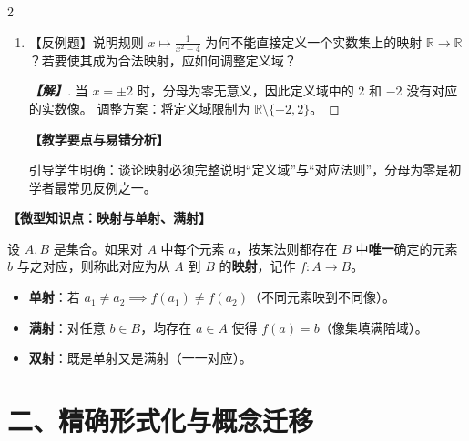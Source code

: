 \documentclass[12pt]{ctexart}
\newenvironment{solution}[1][解]{%
    \par\begingroup\color{blue!85!black}%
    \begin{proof}[\indent\bfseries\color{blue!85!black}【#1】]%
  }{%
    \end{proof}\endgroup\par
  }
\newenvironment{teacherNote}[1][教学要点与易错分析]{%
    \par\vspace{0.6ex}%
    \begingroup\color{teal!80!black}\small
    \noindent\textbf{【#1】}\par\vspace{0.2ex}%
  }{%
    \endgroup\par\vspace{0.6ex}%
  }
\newcommand{\ansspace}[1]{\par\vspace{0.4ex}}
\newcommand{\ansspace}[1]{\vspace{#1}}
\newenvironment{microknowledge}[1][核心定义与记号]{%
  \par\vspace{0.8ex}%
  \def\microtitle{#1}%
  \begin{lrbox}{\microbox}%
    \begin{minipage}{\dimexpr\linewidth-2\fboxsep-2\fboxrule\relax}%
      \textbf{【\microtitle】}\par\vspace{0.3ex}\small
}{%
    \end{minipage}%
  \end{lrbox}%
  \noindent\fbox{\usebox{\microbox}}\par\vspace{0.8ex}%
}
\begin{document}
\begin{multicols}{2}
\begin{enumerate}[series=probchain]
\item 【反例题】说明规则 $x \mapsto \frac{1}{x^2 - 4}$ 为何不能直接定义一个实数集上的映射 $\mathbb{R} \to \mathbb{R}$？若要使其成为合法映射，应如何调整定义域？
\ansspace{3.5cm}
\begin{solution}
当 $x = \pm 2$ 时，分母为零无意义，因此定义域中的 $2$ 和 $-2$ 没有对应的实数像。
调整方案：将定义域限制为 $\mathbb{R} \setminus \{-2, 2\}$。
\end{solution}
\begin{teacherNote}
引导学生明确：谈论映射必须完整说明“定义域”与“对应法则”，分母为零是初学者最常见反例之一。
\end{teacherNote}

\end{enumerate}

\begin{microknowledge}[微型知识点：映射与单射、满射]
设 $A, B$ 是集合。如果对 $A$ 中每个元素 $a$，按某法则都存在 $B$ 中\textbf{唯一}确定的元素 $b$ 与之对应，则称此对应为从 $A$ 到 $B$ 的\textbf{映射}，记作 $f: A \to B$。
\begin{itemize}[leftmargin=*,noitemsep,topsep=1pt]
  \item \textbf{单射}：若 $a_1 \neq a_2 \implies f(a_1) \neq f(a_2)$（不同元素映到不同像）。
  \item \textbf{满射}：对任意 $b \in B$，均存在 $a \in A$ 使得 $f(a) = b$（像集填满陪域）。
  \item \textbf{双射}：既是单射又是满射（一一对应）。
\end{itemize}
\end{microknowledge}

\section*{二、精确形式化与概念迁移}


\end{multicols}
\end{document}
